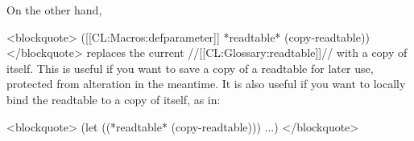 On the other hand,

<blockquote> ([[CL:Macros:defparameter]] *readtable* (copy-readtable)) </blockquote> replaces the current //[[CL:Glossary:readtable]]// with a copy of itself. This is useful if you want to save a copy of a readtable for later use, protected from alteration in the meantime. It is also useful if you want to locally bind the readtable to a copy of itself, as in:

<blockquote> (let ((*readtable* (copy-readtable))) ...) </blockquote>

